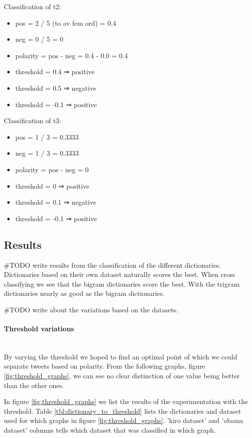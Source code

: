 Classification of t2:
\begin{itemize}
    \item pos = 2 / 5 (to av fem ord) = 0.4
    \item neg = 0 / 5 = 0
    \item polarity = pos - neg = 0.4 - 0.0 = 0.4
    \item threshold = 0.4 ⇒ positive
    \item threshold = 0.5 ⇒ negative
    \item threshold = -0.1 ⇒ positive
\end{itemize}

Classification of t3:
\begin{itemize}
    \item pos = 1 / 3 = 0.3333
    \item neg = 1 / 3 = 0.3333
    \item polarity = pos - neg = 0
    \item threshold = 0 ⇒ positive
    \item threshold = 0.1 ⇒ negative
    \item threshold = -0.1 ⇒ positive
\end{itemize}

\subsection{Results}
#TODO write results from the classification of the different dictionaries. \\
Dictionaries based on their own dataset naturally scores the best. When cross
classifying we see that the bigram dictionaries score the best. With the
trigram dictionaries nearly as good as the bigram dictionaries.

#TODO write about the variations based on the datasets. \\

\paragraph{Threshold variations}
\hspace{0pt}\\
By varying the threshold we hoped to find an optimal point of which we could
separate tweets based on polarity. From the following
graphs, figure \ref{fig:threshold_graphs}, we can see no clear distinction of
one value being better than the other ones.  

In figure \ref{fig:threshold_graphs} we list the results of the experimentation
with the threshold. Table \ref{tbl:dictionary_to_threshold} lists the
dictionaries and dataset used for which graphs in figure \ref{fig:threshold_graphs}.
'kiro dataset' and 'obama dataset' columns tells which dataset that was
classified in which graph.

